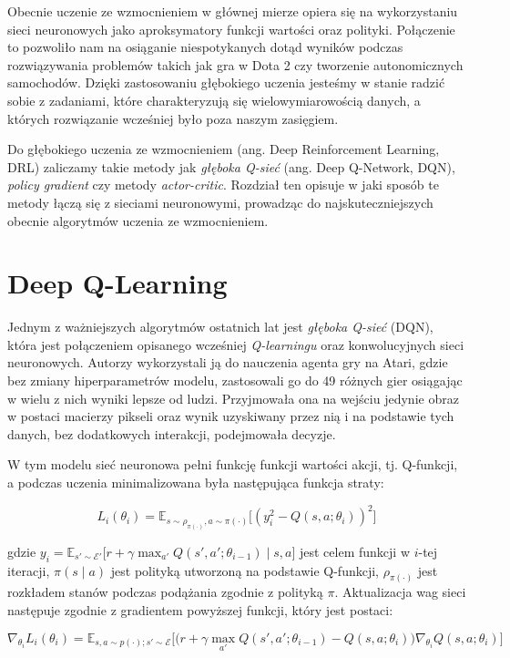 \documentclass[licencjacka]{pracamgr}
\begin{document}
Obecnie uczenie ze wzmocnieniem w głównej mierze opiera się na wykorzystaniu sieci neuronowych jako aproksymatory funkcji wartości oraz polityki. Połączenie to pozwoliło nam na osiąganie niespotykanych dotąd wyników podczas rozwiązywania problemów takich jak gra w Dota 2 czy tworzenie autonomicznych samochodów. Dzięki zastosowaniu głębokiego uczenia jesteśmy w stanie radzić sobie z zadaniami, które charakteryzują się wielowymiarowością danych, a których rozwiązanie wcześniej było poza naszym zasięgiem.

Do głębokiego uczenia ze wzmocnieniem (ang. Deep Reinforcement Learning, DRL) zaliczamy takie metody jak \emph{głęboka Q-sieć} (ang. Deep Q-Network, DQN),  \emph{policy gradient} czy metody \emph{actor-critic}. Rozdział ten opisuje w jaki sposób te metody łączą się z sieciami neuronowymi, prowadząc do najskuteczniejszych obecnie algorytmów uczenia ze wzmocnieniem. 

\section{Deep Q-Learning}

Jednym z ważniejszych algorytmów ostatnich lat jest \emph{głęboka Q-sieć} (DQN), która jest połączeniem opisanego wcześniej \emph{Q-learningu} oraz konwolucyjnych sieci neuronowych. Autorzy wykorzystali ją do nauczenia agenta gry na Atari, gdzie bez zmiany hiperparametrów modelu, zastosowali go do 49 różnych gier osiągając w wielu z nich wyniki lepsze od ludzi. Przyjmowała ona na wejściu jedynie obraz w postaci macierzy pikseli oraz wynik uzyskiwany przez nią i na podstawie tych danych, bez dodatkowych interakcji, podejmowała decyzje.

W tym modelu sieć neuronowa pełni funkcję funkcji wartości akcji, tj. Q-funkcji, a podczas uczenia minimalizowana była następująca funkcja straty:

$$ L_i(\theta_i) = \mathbb{E}_{s \sim \rho_{\pi(\cdot)}, a \sim \pi(\cdot)} \Big[ (y_i^2 - Q(s, a; \theta_i))^2 \Big] $$

gdzie $ y_i = \mathbb{E}_{s' \sim \mathcal{E}'} \big[ r + \gamma \max_{a'} Q(s', a'; \theta_{i - 1}) \mid s, a \big] $ jest celem funkcji w $i$-tej iteracji, $\pi(s \mid a)$ jest polityką utworzoną na podstawie Q-funkcji, $\rho_{\pi(\cdot)} $ jest rozkładem stanów podczas podążania zgodnie z polityką $\pi$. Aktualizacja wag sieci następuje zgodnie z gradientem powyższej funkcji, który jest postaci:

$$ \nabla_{\theta_i}L_i(\theta_i) = \mathbb{E}_{s, a \sim p(\cdot); s' \sim \mathcal{E}} 
\Big[ \Big( r + \gamma \max_{a'} Q(s', a'; \theta_{i - 1}) - Q(s, a; \theta_i) \Big) \nabla_{\theta_i} Q(s, a; \theta_i) \Big] $$
\end{document}
